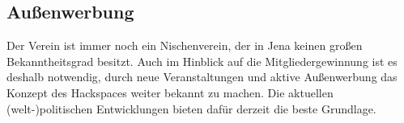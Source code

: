 \documentclass[10pt,DIV16]{scrartcl}
\begin{document}
\subsection{Außenwerbung}

Der Verein ist immer noch ein Nischenverein, der in Jena keinen großen
Bekanntheitsgrad besitzt.  Auch im Hinblick auf die Mitgliedergewinnung ist es
deshalb notwendig, durch neue Veranstaltungen und aktive Außenwerbung das
Konzept des Hackspaces weiter bekannt zu machen.  Die aktuellen
(welt-)politischen Entwicklungen bieten dafür derzeit die beste Grundlage.
\end{document}

